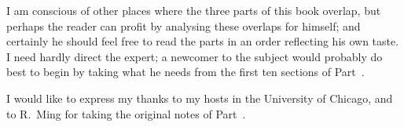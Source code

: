 \documentclass[main]{subfiles}
\begin{document}
I am conscious of other places where the three parts of this book overlap, but perhaps the reader can profit by analysing these overlaps for himself; and certainly he should feel free to read the parts in an order reflecting his own taste. 
I need hardly direct the expert; a newcomer to the subject would probably do best to begin by taking what he needs from the first ten sections of Part~.

I would like to express my thanks to my hosts in the University of Chicago, and to R.~Ming for taking the original notes of Part~.
\end{document}
